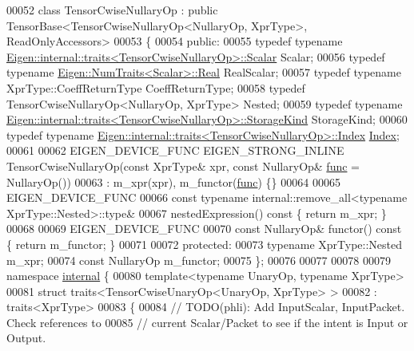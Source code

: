 \begin{DoxyCode}
00052 \textcolor{keyword}{class }TensorCwiseNullaryOp : \textcolor{keyword}{public} TensorBase<TensorCwiseNullaryOp<NullaryOp, XprType>, ReadOnlyAccessors>
00053 \{
00054   \textcolor{keyword}{public}:
00055     \textcolor{keyword}{typedef} \textcolor{keyword}{typename} \hyperlink{struct_eigen_1_1internal_1_1traits}{Eigen::internal::traits<TensorCwiseNullaryOp>::Scalar}
       Scalar;
00056     \textcolor{keyword}{typedef} \textcolor{keyword}{typename} \hyperlink{group___sparse_core___module}{Eigen::NumTraits<Scalar>::Real} RealScalar;
00057     \textcolor{keyword}{typedef} \textcolor{keyword}{typename} XprType::CoeffReturnType CoeffReturnType;
00058     \textcolor{keyword}{typedef} TensorCwiseNullaryOp<NullaryOp, XprType> Nested;
00059     \textcolor{keyword}{typedef} \textcolor{keyword}{typename} \hyperlink{struct_eigen_1_1internal_1_1traits}{Eigen::internal::traits<TensorCwiseNullaryOp>::StorageKind}
       StorageKind;
00060     \textcolor{keyword}{typedef} \textcolor{keyword}{typename} \hyperlink{struct_eigen_1_1internal_1_1traits}{Eigen::internal::traits<TensorCwiseNullaryOp>::Index}
       \hyperlink{namespace_eigen_a62e77e0933482dafde8fe197d9a2cfde}{Index};
00061 
00062     EIGEN\_DEVICE\_FUNC EIGEN\_STRONG\_INLINE TensorCwiseNullaryOp(\textcolor{keyword}{const} XprType& xpr, \textcolor{keyword}{const} NullaryOp& 
      \hyperlink{structfunc}{func} = NullaryOp())
00063         : m\_xpr(xpr), m\_functor(\hyperlink{structfunc}{func}) \{\}
00064 
00065     EIGEN\_DEVICE\_FUNC
00066     \textcolor{keyword}{const} \textcolor{keyword}{typename} internal::remove\_all<typename XprType::Nested>::type&
00067     nestedExpression()\textcolor{keyword}{ const }\{ \textcolor{keywordflow}{return} m\_xpr; \}
00068 
00069     EIGEN\_DEVICE\_FUNC
00070     \textcolor{keyword}{const} NullaryOp& functor()\textcolor{keyword}{ const }\{ \textcolor{keywordflow}{return} m\_functor; \}
00071 
00072   \textcolor{keyword}{protected}:
00073     \textcolor{keyword}{typename} XprType::Nested m\_xpr;
00074     \textcolor{keyword}{const} NullaryOp m\_functor;
00075 \};
00076 
00077 
00078 
00079 \textcolor{keyword}{namespace }\hyperlink{namespaceinternal}{internal} \{
00080 \textcolor{keyword}{template}<\textcolor{keyword}{typename} UnaryOp, \textcolor{keyword}{typename} XprType>
00081 \textcolor{keyword}{struct }traits<TensorCwiseUnaryOp<UnaryOp, XprType> >
00082     : traits<XprType>
00083 \{
00084   \textcolor{comment}{// TODO(phli): Add InputScalar, InputPacket.  Check references to}
00085   \textcolor{comment}{// current Scalar/Packet to see if the intent is Input or Output.}

\end{DoxyCode}
